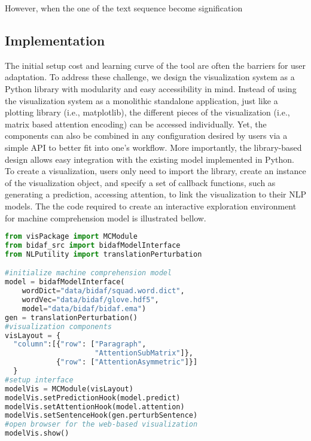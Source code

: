 However, when the one of the text sequence become signification 

\subsection{Implementation}
The initial setup cost and learning curve of the tool are often the barriers for user adaptation. To address these challenge, we design the visualization system as a Python library with modularity and easy accessibility in mind.
Instead of using the visualization system as a monolithic standalone application, just like a plotting library (i.e., matplotlib), the different pieces of the visualization (i.e., matrix based attention encoding) can be accessed individually.
% 
Yet, the components can also be combined in any configuration desired by users via a simple API to better fit into one's workflow.
More importantly, the library-based design allows easy integration with the existing model implemented in Python.
%
To create a visualization, users only need to import the library, create an instance of the visualization object, and specify a set of callback functions, such as generating a prediction, accessing attention, to link the visualization to their NLP models. The the code required to create an interactive exploration environment for machine comprehension model is illustrated bellow.

\begin{lstlisting}[language=Python, caption=Code for setting up the visualization system shown in the paper.]
from visPackage import MCModule
from bidaf_src import bidafModelInterface
from NLPutility import translationPerturbation

#initialize machine comprehension model
model = bidafModelInterface(
    wordDict="data/bidaf/squad.word.dict",
    wordVec="data/bidaf/glove.hdf5",
    model="data/bidaf/bidaf.ema")
gen = translationPerturbation()
#visualization components
visLayout = {
  "column":[{"row": ["Paragraph", 
                     "AttentionSubMatrix"]},
            {"row": ["AttentionAsymmetric"]}]
  }
#setup interface
modelVis = MCModule(visLayout)
modelVis.setPredictionHook(model.predict)
modelVis.setAttentionHook(model.attention)
modelVis.setSentenceHook(gen.perturbSentence)
#open browser for the web-based visualization
modelVis.show()
\end{lstlisting}




